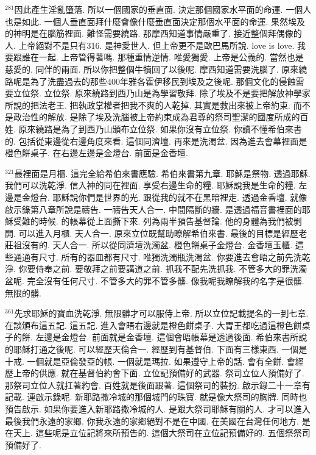 \documentclass{book}
\begin{document}
$^{281}$因此產生淫亂墮落.
所以一個國家的垂直面.
決定那個國家水平面的命運.
一個人也是如此.
一個人垂直面拜什麼會像什麼垂直面決定那個水平面的命運.
果然埃及的神明是在腦筋裡面.
難怪需要繞路.
那摩西知道事情嚴重了.
接近整個拜偶像的人.
上帝絕對不是只有316.
是神愛世人.
但上帝更不是歐巴馬所說.
love is love.
我要跟誰在一起.
上帝管得著嗎.
那種重情逆情.
唯愛獨愛.
上帝是公義的.
當然也是慈愛的.
同伴的兩面.
所以你把整個牛犢回了以後呢.
摩西知道需要洗腦了.
原來繞路呢是為了洗盡過去的那些400年雅各霍伊移民到埃及之後呢.
那個文化的侵蝕需要立位祭.
立位祭.
原來繞路到西乃山是為學習敬拜.
除了埃及不是要把解放神學家所說的把法老王.
把執政掌權者把我不爽的人乾掉.
其實是救出來被上帝約束.
而不是政治性的解放.
是除了埃及洗腦被上帝約束成為君尊的祭司聖潔的國度所成的百姓.
原來繞路是為了到西乃山頒布立位祭.
如果你沒有立位祭.
你讀不懂希伯來書的.
包括從東邊從右邊角度來看.
這個同濟壇.
再來是洗濁盆.
因為進去會幕裡面是橙色餅桌子.
在右邊左邊是金燈台.
前面是金香壇.

$^{321}$最裡面是月櫃.
這完全給希伯來書應驗.
希伯來書第九章.
耶穌是祭物.
透過耶穌.
我們可以洗乾淨.
信入神的同在裡面.
享受右邊生命的糧.
耶穌說我是生命的糧.
左邊是金燈台.
耶穌說你們是世界的光.
跟從我的就不在黑暗裡走.
透過金香壇.
就像啟示錄第八章所說是禱告.
一禱告天人合一.
中間隔斷的牆.
是透過福音書裡面的耶穌受難的時候.
的帳幕從上面撕下來.
列為兩半預告基督論.
他的身體為我們被剝開.
可以進入月櫃.
天人合一.
原來立位既幫助瞭解希伯來書.
最後的目標是經歷老莊祖沒有的.
天人合一.
所以從同濟壇洗濁盆.
橙色餅桌子金燈台.
金香壇玉櫃.
這些通通有尺寸.
所有的器皿都有尺寸.
唯獨洗濁瓶洗濁盆.
你要進去會晤之前先洗乾淨.
你要侍奉之前.
要敬拜之前要講道之前.
抓我不配先洗抓我.
不管多大的罪洗濁盆呢.
完全沒有任何尺寸.
不管多大的罪不管多髒.
像我呢我瞭解我的名字是很髒.
無限的髒.

$^{361}$先求耶穌的寶血洗乾淨.
無限髒才可以服侍上帝.
所以立位記載提名的一到七章.
在談頒布這五記.
這五記.
進入會晤右邊就是橙色餅桌子.
大胃王都吃過這橙色餅桌子的餅.
左邊是金燈台.
前面就是金香壇.
這個會晤帳幕是透過後面.
希伯來書所說的耶穌打通之後呢.
可以經歷天倫合一.
經歷到有基督伯.
下面有三樣東西.
一個是十戒.
一個就是亞倫發亞的帳.
一個就是瑪拉.
如果遵守上帝的話.
會有全餅.
會經歷上帝的供應.
就在基督伯約會下面.
立位記預備好的武器.
祭司立位人預備好了.
那祭司立位人就扛著約會.
百姓就是後面跟著.
這個祭司的裝扮.
啟示錄二十一章有記載.
連啟示錄呢.
新耶路撒冷城的那個城門的珠寶.
就是像大祭司的胸牌.
同時也預告啟示.
如果你要進入新耶路撒冷城的人.
是跟大祭司耶穌有關的人.
才可以進入最後我們永遠的家鄉.
你我永遠的家鄉絕對不是在中國.
在美國在台灣任何地方.
是在天上.
這些呢是立位記將來所預告的.
這個大祭司在立位記預備好的.
五個祭祭司預備好了.
\end{document}
